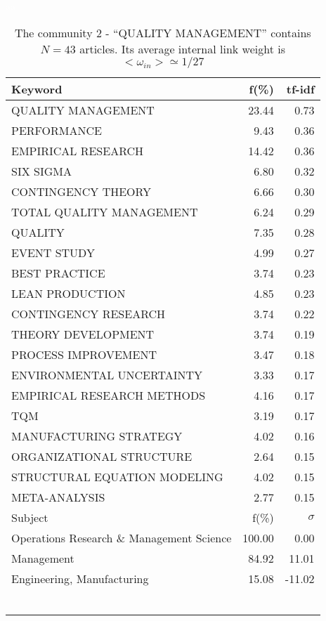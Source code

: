 \documentclass[a4paper,11pt]{report}
\begin{document}
\begin{landscape}
\clearpage

\begin{table}[!ht]
\caption{The community 2 - ``QUALITY MANAGEMENT'' contains $N = 43$ articles. Its average internal link weight is $<\omega_{in}> \simeq 1/27$ }
\textcolor{white}{aa}\\
{\scriptsize\begin{tabular}{|l r  r|}
\hline
Keyword & f(\%) & tf-idf \\
\hline
QUALITY MANAGEMENT & 23.44 & 0.73\\
PERFORMANCE & 9.43 & 0.36\\
EMPIRICAL RESEARCH & 14.42 & 0.36\\
SIX SIGMA & 6.80 & 0.32\\
CONTINGENCY THEORY & 6.66 & 0.30\\
TOTAL QUALITY MANAGEMENT & 6.24 & 0.29\\
QUALITY & 7.35 & 0.28\\
EVENT STUDY & 4.99 & 0.27\\
BEST PRACTICE & 3.74 & 0.23\\
LEAN PRODUCTION & 4.85 & 0.23\\
CONTINGENCY RESEARCH & 3.74 & 0.22\\
THEORY DEVELOPMENT & 3.74 & 0.19\\
PROCESS IMPROVEMENT & 3.47 & 0.18\\
ENVIRONMENTAL UNCERTAINTY & 3.33 & 0.17\\
EMPIRICAL RESEARCH METHODS & 4.16 & 0.17\\
TQM & 3.19 & 0.17\\
MANUFACTURING STRATEGY & 4.02 & 0.16\\
ORGANIZATIONAL STRUCTURE & 2.64 & 0.15\\
STRUCTURAL EQUATION MODELING & 4.02 & 0.15\\
META-ANALYSIS & 2.77 & 0.15\\
\hline
\hline
Subject & f(\%) & $\sigma$\\
\hline
Operations Research \& Management Science & 100.00 & 0.00\\
Management & 84.92 & 11.01\\
Engineering, Manufacturing & 15.08 & -11.02\\
 &  & \\
 &  & \\
 &  & \\
 &  & \\
 &  & \\
 &  & \\

\end{tabular}}
\end{table}
\end{landscape}
\end{document}
